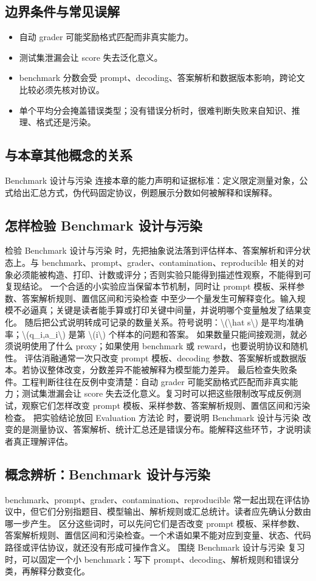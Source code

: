 \documentclass[a4paper]{article}
\begin{document}
\subsection{边界条件与常见误解}
\begin{itemize}
\item 自动 grader 可能奖励格式匹配而非真实能力。
\item 测试集泄漏会让 score 失去泛化意义。
\item benchmark 分数会受 prompt、decoding、答案解析和数据版本影响，跨论文比较必须先核对协议。
\item 单个平均分会掩盖错误类型；没有错误分析时，很难判断失败来自知识、推理、格式还是污染。
\end{itemize}
\subsection{与本章其他概念的关系}
Benchmark 设计与污染 连接本章的能力声明和证据标准：定义限定测量对象，公式给出汇总方式，伪代码固定协议，例题展示分数如何被解释和误解释。
\subsection{怎样检验 Benchmark 设计与污染}
检验 Benchmark 设计与污染 时，先把抽象说法落到评估样本、答案解析和评分状态上。与 benchmark、prompt、grader、contamination、reproducible 相关的对象必须能被构造、打印、计数或评分；否则实验只能得到描述性观察，不能得到可复现结论。
一个合适的小实验应当保留本节机制，同时让 prompt 模板、采样参数、答案解析规则、置信区间和污染检查 中至少一个量发生可解释变化。输入规模不必逼真；关键是读者能手算或打印关键中间量，并说明哪个变量触发了结果变化。
随后把公式说明转成可记录的数量关系。符号说明：\textbackslash{}(\textbackslash{}hat s\textbackslash{}) 是平均准确率；\textbackslash{}(q\_i,a\_i\textbackslash{}) 是第 \textbackslash{}(i\textbackslash{}) 个样本的问题和答案。 如果数量只能间接观测，就必须说明使用了什么 proxy；如果使用 benchmark 或 reward，也要说明协议和随机性。
评估消融通常一次只改变 prompt 模板、decoding 参数、答案解析或数据版本。若协议整体改变，分数差异不能被解释为模型能力差异。
最后检查失败条件。工程判断往往在反例中变清楚：自动 grader 可能奖励格式匹配而非真实能力；测试集泄漏会让 score 失去泛化意义。复习时可以把这些限制改写成反例测试，观察它们怎样改变 prompt 模板、采样参数、答案解析规则、置信区间和污染检查。
把实验结论放回 Evaluation 方法论 时，要说明 Benchmark 设计与污染 改变的是测量协议、答案解析、统计汇总还是错误分布。能解释这些环节，才说明读者真正理解评估。
\subsection{概念辨析：Benchmark 设计与污染}
benchmark、prompt、grader、contamination、reproducible 常一起出现在评估协议中，但它们分别指题目、模型输出、解析规则或汇总统计。读者应先确认分数由哪一步产生。
区分这些词时，可以先问它们是否改变 prompt 模板、采样参数、答案解析规则、置信区间和污染检查。一个术语如果不能对应到变量、状态、代码路径或评估协议，就还没有形成可操作含义。
围绕 Benchmark 设计与污染 复习时，可以固定一个小 benchmark：写下 prompt、decoding、解析规则和错误分类，再解释分数变化。
\end{document}
